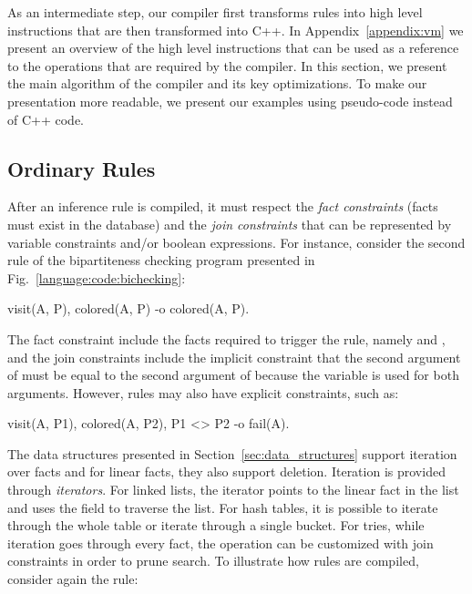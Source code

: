 As an intermediate step, our compiler first transforms rules into high level
instructions that are then transformed into C++. In Appendix~\ref{appendix:vm}
we present an overview of the high level instructions that can be used as a
reference to the operations that are required by the compiler. In this section,
we present the main algorithm of the compiler and its key optimizations. To make
our presentation more readable, we present our examples using pseudo-code
instead of C++ code.

\subsection{Ordinary Rules}\label{sec:compile}

After an inference rule is compiled, it must respect the \emph{fact constraints}
(facts must exist in the database) and the \emph{join constraints} that can be
represented by variable constraints and/or boolean expressions. For instance,
consider the second rule of the bipartiteness checking program presented in
Fig.~\ref{language:code:bichecking}:

\begin{Code}
visit(A, P),
colored(A, P)
   -o colored(A, P).
\end{Code}

The fact constraint include the facts required to trigger the rule, namely
 and , and the join constraints include
the implicit constraint that the second argument of  must be equal
to the second argument of  because the variable  is used
for both arguments. However, rules may also have explicit constraints, such as:

\begin{Code}
visit(A, P1),
colored(A, P2),
P1 <> P2
   -o fail(A).
\end{Code}

The data structures presented in Section~\ref{sec:data_structures} support
iteration over facts and for linear facts, they also support deletion. Iteration
is provided through \emph{iterators}. For linked lists, the iterator points to
the linear fact in the list and uses the  field to traverse the list.
For hash tables, it is possible to iterate through the whole table or iterate
through a single bucket. For tries, while iteration goes through every fact, the
operation can be customized with join constraints in order to prune search. To
illustrate how rules are compiled, consider again the rule:

